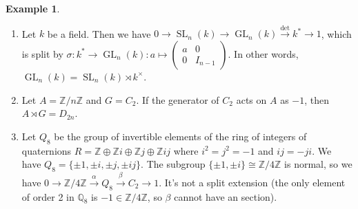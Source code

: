 \documentclass{article}
\newcommand{\Z}{\mathbb{Z}}
\newcommand{\Q}{\mathbb{Q}}
\newcommand{\GL}{\operatorname{GL}}
\newcommand{\SL}{\operatorname{SL}}
\theoremstyle{definition}
\newtheorem{example}[defn]{Example}
\begin{document}
\begin{example}
\begin{enumerate}
\item Let $k$ be a field. Then we have $0\rightarrow\SL_n(k)\rightarrow\GL_n(k)\xrightarrow{\det}k^\ast\rightarrow 1$, which is split by $\sigma:k^\ast\rightarrow\GL_n(k):a\mapsto\begin{pmatrix}a & 0 \\ 0 & I_{n-1}\end{pmatrix}$. In other words, $\GL_n(k)=\SL_n(k)\rtimes k^\times$.
\item Let $A=\Z/n\Z$ and $G=C_2$. If the generator of $C_2$ acts on $A$ as $-1$, then $A\rtimes G=D_{2n}$.
\item Let $Q_8$ be the group of invertible elements of the ring of integers of quaternions $R=\Z\oplus\Z i\oplus \Z j\oplus\Z ij$ where $i^2=j^2=-1$ and $ij=-ji$. We have $Q_8=\{\pm 1,\pm i,\pm j,\pm ij\}$. The subgroup $\{\pm 1,\pm i\}\cong\Z/4\Z$ is normal, so we have $0\rightarrow\Z/4\Z\xrightarrow{\alpha}Q_8\xrightarrow{\beta}C_2\rightarrow 1$. It's not a split extension (the only element of order 2 in $\Q_8$ is $-1\in\Z/4\Z$, so $\beta$ cannot have an section).
\end{enumerate}
\end{example}
\end{document}
